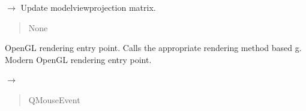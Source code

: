 \documentclass[a4paper,10pt,english,openany,oneside]{sphinxmanual}
\begin{document}
\begin{fulllineitems}
\begin{fulllineitems}
\label{\detokenize{api/ui:picogl.ui.backend.qt.base.GLBase.update_mvp}}
\pysigstartsignatures
\pysiglinewithargsret
{}
{}
{{ $\rightarrow$ }}
\pysigstopsignatures
\sphinxAtStartPar
Update model\sphinxhyphen{}view\sphinxhyphen{}projection matrix.

\end{fulllineitems}


\begin{fulllineitems}
\label{\detokenize{api/ui:picogl.ui.backend.qt.base.GLBase.paintGL}}
\pysigstartsignatures
\pysiglinewithargsret
{}
{}
{}
\pysigstopsignatures\begin{quote}\begin{description}
\sphinxAtStartPar
None

\end{description}\end{quote}

\sphinxAtStartPar
OpenGL rendering entry point. Calls the appropriate rendering method based g.
Modern OpenGL rendering entry point.

\end{fulllineitems}


\begin{fulllineitems}
\label{\detokenize{api/ui:picogl.ui.backend.qt.base.GLBase.mousePressEvent}}
\pysigstartsignatures
\pysiglinewithargsret
{}
{}
{{ $\rightarrow$ }}
\pysigstopsignatures\begin{quote}\begin{description}
\sphinxAtStartPar
{} \textendash{} QMouseEvent

\end{description}\end{quote}


\end{fulllineitems}
\end{fulllineitems}
\end{document}
